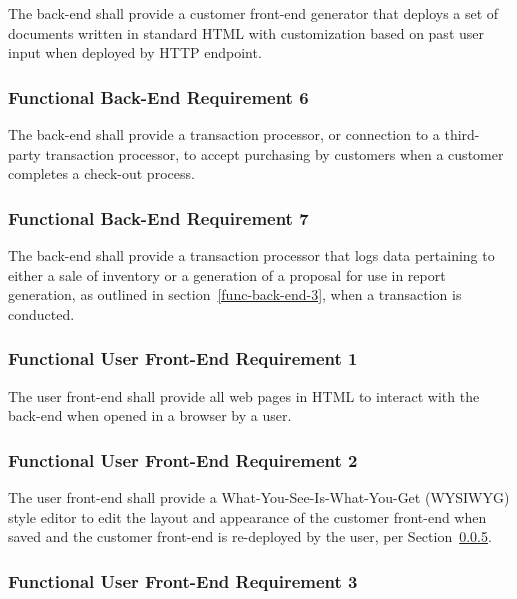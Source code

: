\documentclass{article}
\begin{document}
The back-end shall provide a customer front-end generator that deploys a set of
documents written in standard HTML with customization based on past
user input when deployed by HTTP endpoint.

\subsubsection{Functional Back-End Requirement 6}
\label{func-back-end-6}

The back-end shall provide a transaction processor, or connection to a
third-party transaction processor, to accept purchasing by customers
when a customer completes a check-out process.

\subsubsection{Functional Back-End Requirement 7}
\label{func-back-end-7}

The back-end shall provide a transaction processor that logs data pertaining
to either a sale of inventory or a generation of a proposal for use in report
generation, as outlined in section~\ref{func-back-end-3}, when a transaction
is conducted.

\subsubsection{Functional User Front-End Requirement 1}
\label{func-user-front-end-1}

The user front-end shall provide all web pages in HTML to interact with the
back-end when opened in a browser by a user.

\subsubsection{Functional User Front-End Requirement 2}
\label{func-user-front-end-2}

The user front-end shall provide a What-You-See-Is-What-You-Get (WYSIWYG) style
editor to edit the layout and appearance of the customer front-end when saved
and the customer front-end is re-deployed by the user, per
Section~\ref{func-user-front-end-3}.

\subsubsection{Functional User Front-End Requirement 3}
\label{func-user-front-end-3}
\end{document}
